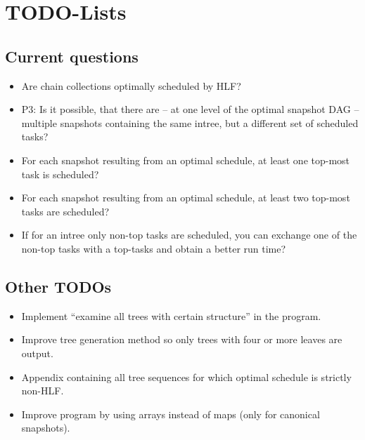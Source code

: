\documentclass[a4paper, 11pt]{report}
\begin{document}
\chapter{TODO-Lists}
\label{chap:todo}

\section{Current questions}
\label{chap:current-questions}

\begin{itemize}
\item Are chain collections optimally scheduled by HLF?
\item P3: Is it possible, that there are -- at one level of the optimal snapshot DAG -- multiple snapshots containing the same intree, but a different set of scheduled tasks?
\item For each snapshot resulting from an optimal schedule, at least one top-most task is scheduled?
\item For each snapshot resulting from an optimal schedule, at least two top-most tasks are scheduled?
\item If for an intree only non-top tasks are scheduled, you can exchange one of the non-top tasks with a top-tasks and obtain a better run time?
\end{itemize}

\section{Other TODOs}

\begin{itemize}
\item Implement ``examine all trees with certain structure'' in the program.
\item Improve tree generation method so only trees with four or more leaves are output.
\item Appendix containing all tree sequences for which optimal schedule is strictly non-HLF.
\item Improve program by using arrays instead of maps (only for canonical snapshots).  
\end{itemize}

%
%
%
%
%
%
%
\end{document}
